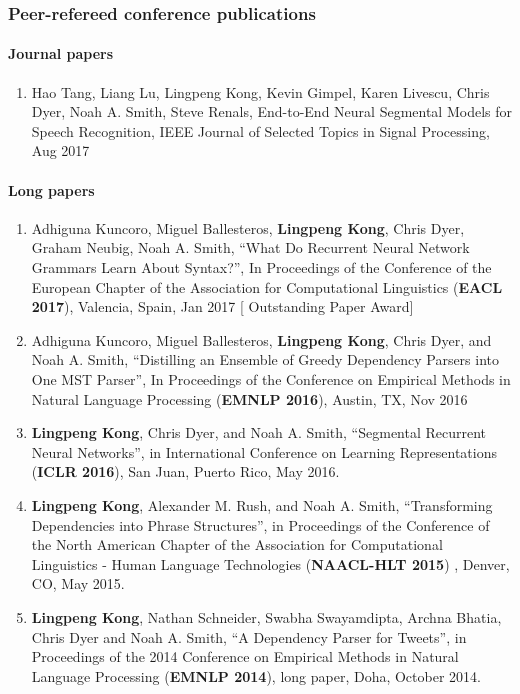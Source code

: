 \documentclass[letterpaper]{article}
\begin{document}
\subsubsection*{Peer-refereed conference publications}
\paragraph*{Journal papers}
\begin{enumerate}
\item \label{journal2017} Hao Tang, Liang Lu, Lingpeng Kong, Kevin Gimpel, Karen Livescu, Chris Dyer, Noah A. Smith, Steve Renals, End-to-End Neural Segmental Models for Speech Recognition, IEEE Journal of Selected Topics in Signal Processing, Aug 2017
\end{enumerate}

\paragraph*{Long papers}
\begin{enumerate}
\item \label{eacl2017} Adhiguna Kuncoro, Miguel Ballesteros, \textbf{Lingpeng Kong}, Chris Dyer, Graham Neubig, Noah A. Smith, ``What Do Recurrent Neural Network Grammars Learn About Syntax?'', In Proceedings of the Conference of the European Chapter of the Association for Computational Linguistics (\textbf{EACL 2017}), Valencia, Spain, Jan 2017 [{\color{red} Outstanding Paper Award}]

\item \label{emnlp2016} Adhiguna Kuncoro, Miguel Ballesteros, \textbf{Lingpeng Kong}, Chris Dyer, and Noah A. Smith, ``Distilling an Ensemble of Greedy Dependency Parsers into One MST Parser'', In Proceedings of the Conference on Empirical Methods in Natural Language Processing (\textbf{EMNLP 2016}), Austin, TX, Nov 2016

\item \label{iclr2016} \textbf{Lingpeng Kong}, Chris Dyer, and Noah A. Smith, ``Segmental Recurrent Neural Networks'', in International Conference on Learning Representations (\textbf{ICLR 2016}), San Juan, Puerto Rico, May 2016.

\item \label{naacl2015} \textbf{Lingpeng Kong}, Alexander M. Rush, and Noah A. Smith, ``Transforming Dependencies into Phrase Structures'', in Proceedings of the Conference of the North American Chapter of the Association for Computational Linguistics - Human Language Technologies (\textbf{NAACL-HLT 2015}) , Denver, CO, May 2015.

\item \label{emnlp2014a} \textbf{Lingpeng Kong}, Nathan Schneider, Swabha Swayamdipta, Archna Bhatia, Chris Dyer and Noah A. Smith, ``A Dependency Parser for Tweets'', in Proceedings of the 2014 Conference on Empirical Methods in Natural Language Processing (\textbf{EMNLP 2014}), long paper, Doha, October 2014. 

\end{enumerate} 
\end{document}

